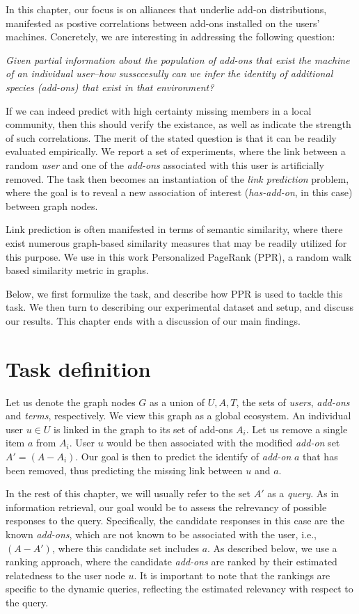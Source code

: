 \documentclass[11pt,oneside]{book}
\let\Oldsection\section
\renewcommand{\section}{\FloatBarrier\Oldsection}
\begin{document}
In this chapter, our focus is on alliances that underlie add-on
distributions, manifested as postive correlations between add-ons
installed on the users' machines. Concretely, we are interesting in
addressing the following question:

{\it Given partial information about the population of add-ons that
  exist the machine of an individual user--how sussccesully can we
  infer the identity of additional species (add-ons) that exist in
  that environment?}

If we can indeed predict with high certainty missing members in a
local community, then this should verify the existance, as well as
indicate the strength of such correlations. The merit of the stated
question is that it can be readily evaluated empirically. We report a
set of experiments, where the link between a random {\it user} and one
of the {\it add-ons} associated with this user is artificially
removed. The task then becomes an instantiation of the {\it link
  prediction} problem, where the goal is to reveal a new association
of interest ({\it has-add-on}, in this case) between graph nodes.

Link prediction is often manifested in terms of semantic similarity,
where there exist numerous graph-based similarity measures that may be
readily utilized for this purpose. We use in this work Personalized
PageRank (PPR), a random walk based similarity metric in graphs.

Below, we first formulize the task, and describe how PPR is used to
tackle this task. We then turn to describing our experimental dataset
and setup, and discuss our results. This chapter ends with a
discussion of our main findings.


\section{Task definition}
\label{sec:task}

Let us denote the graph nodes $G$ as a union of $U,A,T$, the sets of
{\it users}, {\it add-ons} and {\it terms}, respectively. We view this
graph as a global ecosystem. An individual user $u\in U$ is linked in
the graph to its set of add-ons $A_i$. Let us remove a single item $a$
from $A_i$. User $u$ would be then associated with the modified {\it
  add-on} set $A'=(A-A_i)$. Our goal is then to predict the identify
of {\it add-on} $a$ that has been removed, thus predicting the missing
link between $u$ and $a$.

In the rest of this chapter, we will usually refer to the set $A'$ as
a {\it query}. As in information retrieval, our goal would be to
assess the relrevancy of possible responses to the
query. Specifically, the candidate responses in this case are the
known {\it add-ons}, which are not known to be associated with the
user, i.e., $(A-A')$, where this candidate set includes $a$. As
described below, we use a ranking approach, where the candidate {\it
  add-ons} are ranked by their estimated relatedness to the user node
$u$. It is important to note that the rankings are specific to the
dynamic queries, reflecting the estimated relevancy with respect to
the query.
\end{document}
